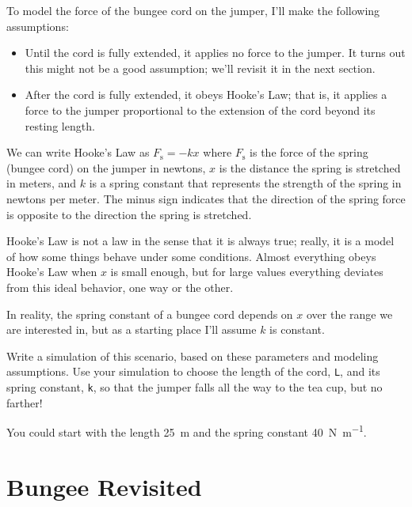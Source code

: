 To model the force of the bungee cord on the jumper, I'll make the following assumptions:

\begin{itemize}

\item Until the cord is fully extended, it applies no force to the jumper.  It turns out this might not be a good assumption; we'll revisit it in the next section.

\item After the cord is fully extended, it obeys Hooke's Law; that is, it applies a force to the jumper proportional to the extension of the cord beyond its resting length.

\end{itemize}

We can write Hooke's Law as
%
$F_\mathrm{s} = -k x$
%
where $F_\mathrm{s}$ is the force of the spring (bungee cord) on the jumper in newtons, $x$ is the distance the spring is stretched in meters, and $k$ is a spring constant that represents the strength of the spring in newtons per meter.
The minus sign indicates that the direction of the spring force is opposite to the direction the spring is stretched.


Hooke's Law is not  a law in the sense that it is always true; really, it is a model of how some things behave under some conditions.
Almost everything obeys Hooke's Law when $x$ is small enough, but for large values everything deviates from this ideal behavior, one way or the other.

In reality, the spring constant of a bungee cord depends on $x$ over the range we are interested in, but as a starting place I'll assume $k$ is constant.


\begin{ex}

Write a simulation of this scenario, based on these parameters and modeling assumptions.
Use your simulation to choose the length of the cord, \lstinline{L}, and its spring constant, \lstinline{k}, so that the jumper falls all the way to the tea cup, but no farther!

You could start with the length \SI{25}{\meter} and the spring constant \SI{40}{\newton \per \meter}.
\end{ex}


\section{Bungee Revisited}


